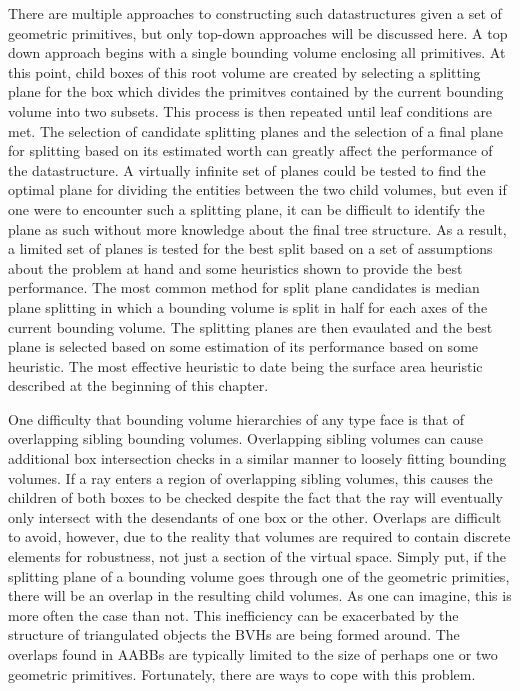\documentclass[12pt, a4paper]{article}
\begin{document}
There are multiple approaches to constructing such datastructures given a set of geometric primitives, but only top-down approaches will be discussed here. A top down approach begins with a single bounding volume enclosing all primitives. At this point, child boxes of this root volume are created by selecting a splitting plane for the box which divides the primitves contained by the current bounding volume into two subsets. This process is then repeated until leaf conditions are met. The selection of candidate splitting planes and the selection of a final plane for splitting based on its estimated worth can greatly affect the performance of the datastructure. A virtually infinite set of planes could be tested to find the optimal plane for dividing the entities between the two child volumes, but even if one were to encounter such a splitting plane, it can be difficult to identify the plane as such without more knowledge about the final tree structure. As a result, a limited set of planes is tested for the best split based on a set of assumptions about the problem at hand and some heuristics shown to provide the best performance. The most common method for split plane candidates is median plane splitting in which a bounding volume is split in half for each axes of the current bounding volume. The splitting planes are then evaulated and the best plane is selected based on some estimation of its performance based on some heuristic. The most effective heuristic to date being the surface area heuristic described at the beginning of this chapter.

One difficulty that bounding volume hierarchies of any type face is that of overlapping sibling bounding volumes. Overlapping sibling volumes can cause additional box intersection checks in a similar manner to loosely fitting bounding volumes. If a ray enters a region of overlapping sibling volumes, this causes the children of both boxes to be checked despite the fact that the ray will eventually only intersect with the desendants of one box or the other. Overlaps are difficult to avoid, however, due to the reality that volumes are required to contain discrete elements for robustness, not just a section of the virtual space. Simply put, if the splitting plane of a bounding volume goes through one of the geometric primities, there will be an overlap in the resulting child volumes. As one can imagine, this is more often the case than not. This inefficiency can be exacerbated by the structure of triangulated objects the BVHs are being formed around. The overlaps found in AABBs are typically limited to the size of perhaps one or two geometric primitives. Fortunately, there are ways to cope with this problem.
\end{document}
